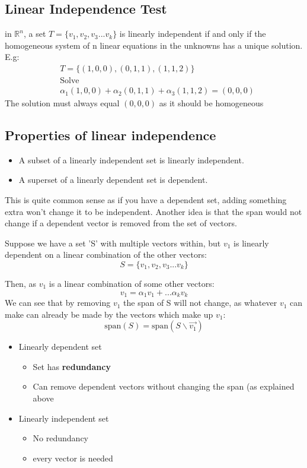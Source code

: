 \documentclass[11pt]{book}
\begin{document}
{\subsection{Linear Independence Test}
\par{in $\mathbb{R}^{n}$, a set $T=\lbrace v_{1}, v_{2}, v_{3}...v_{k}\rbrace$ is linearly independent if and only if the homogeneous system of n linear equations in the unknowns has a unique solution. E.g: }
\begin{align*}
	& T=\lbrace\left(1,0,0\right), \left(0,1,1\right), \left(1,1,2\right)\rbrace \\
	& \text{Solve } \\ 
	& \alpha_{1}\left(1,0,0\right)+\alpha_{2}\left(0,1,1\right)+\alpha_{3}\left(1,1,2\right)=\left(0,0,0\right)
\end{align*}
The solution must always equal $\left(0,0,0\right)$ as it should be homogeneous
\subsection{Properties of linear independence}
\begin{itemize}
	\item{A subset of a linearly independent set is linearly independent.}
	\item{A superset of a linearly dependent set is dependent.}
\end{itemize}
\par{This is quite common sense as if you have a dependent set, adding something extra won't change it to be independent. Another idea is that the span would not change if a dependent vector is removed from the set of vectors. 

Suppose we have a set 'S' with multiple vectors within, but $v_{1}$ is linearly dependent on a linear combination of the other vectors: \[
S=\lbrace v_{1}, v_{2}, v_{3}... v_{k}\rbrace 
\] \par{Then, as $v_{1}$ is a linear combination of some other vectors: \[
 v_{1}=\alpha_{1}v_{1}+...\alpha_{k}v_{k}
\] We can see that by removing $v_{1}$ the span of S will not change, as whatever $v_{1}$ can make can already be made by the vectors which make up $v_{1}$: \[
\mathrm{span}\left(S\right)=\mathrm{span}\left(S\backslash\vec{v_{1}}\right)
\] }
\begin{itemize}
	\item{Linearly dependent set}
		\begin{itemize}
			\item{Set has \textbf{redundancy}}
			\item{Can remove dependent vectors without changing the span (as explained above}
		\end{itemize}
	\item{Linearly independent set}
		\begin{itemize}
			\item{No redundancy}
			\item{every vector is needed}
		\end{itemize}
\end{itemize}
}}
\end{document}
